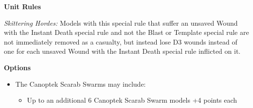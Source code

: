 \begin{minipage}[t]{0.72\textwidth}
	\vspace*{2em}
	\textbf{Unit Rules}
	
	\textit{Skittering Hordes:} Models with this special rule that suffer an unsaved Wound with the Instant Death special rule and not the Blast or Template special rule are not immediately removed as a casualty, but instead lose D3 wounds instead of one for each unsaved Wound with the Instant Death special rule inflicted on it.

	\vspace*{2em}
	\textbf{Options}
	\begin{itemize}
		\item The Canoptek Scarab Swarms may include:
		\begin{itemize}
			\item Up to an additional 6 Canoptek Scarab Swarm models \dotfill +4 points each
		\end{itemize}
	\end{itemize}
\end{minipage}
\hspace{0.5em}


\newpage
